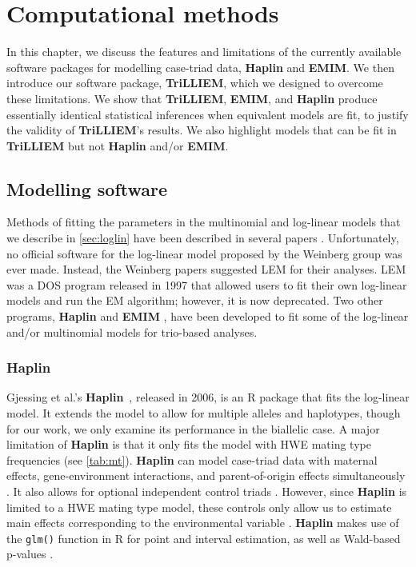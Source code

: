 \chapter{Computational methods}\label{chap:methods}

In this chapter, we discuss the features and limitations of the currently available software packages for modelling case-triad data, \textbf{Haplin} and \textbf{EMIM}.
We then introduce our software package, \textbf{TriLLIEM}, which we designed to overcome these limitations.
We show that \textbf{TriLLIEM}, \textbf{EMIM}, and \textbf{Haplin} produce essentially identical statistical inferences when equivalent models are fit, to justify the validity of \textbf{TriLLIEM}'s results.
We also highlight models that can be fit in \textbf{TriLLIEM} but not \textbf{Haplin} and/or \textbf{EMIM}.

\section{Modelling software}

Methods of fitting the parameters in the multinomial and log-linear models that we describe in \cref{sec:loglin} have been described in several papers \cite{Wilc+98, Wein+98, Wein99, UmbaWein00, WeinUmba05, Ains+11}.
Unfortunately, no official software for the log-linear model proposed by the Weinberg group was ever made.
Instead, the Weinberg papers \cite{Wein+98, Wein99, UmbaWein00, WeinUmba05} suggested LEM \cite{Verm97} for their analyses.
LEM was a DOS program released in 1997 that allowed users to fit their own log-linear models and run the EM algorithm; however, it is now deprecated.
Two other programs, \textbf{Haplin} \cite{GjesLie06} and \textbf{EMIM} \cite{HoweCord12}, have been developed to fit some of the log-linear and/or multinomial models for trio-based analyses.

\subsection{Haplin}

Gjessing et al.'s \textbf{Haplin}~\cite{GjesLie06}, released in 2006, is an R package that fits the log-linear model.
It extends the model to allow for multiple alleles and haplotypes, though for our work, we only examine its performance in the biallelic case.
A major limitation of \textbf{Haplin} is that it only fits the model with HWE mating type frequencies (see \cref{tab:mt}).
\textbf{Haplin} can model case-triad data with maternal effects, gene-environment interactions, and parent-of-origin effects simultaneously \cite{GjesLie06, Juge+12, Gjer+18}.
It also allows for optional independent control triads \cite{Juge+12}.
However, since \textbf{Haplin} is limited to a HWE mating type model, these controls only allow us to estimate main effects corresponding to the environmental variable \cite{Juge+12}.
\textbf{Haplin} makes use of the \texttt{glm()} function in R \cite{R21} for point and interval estimation, as well as Wald-based p-values \cite{GjesLie06}.

